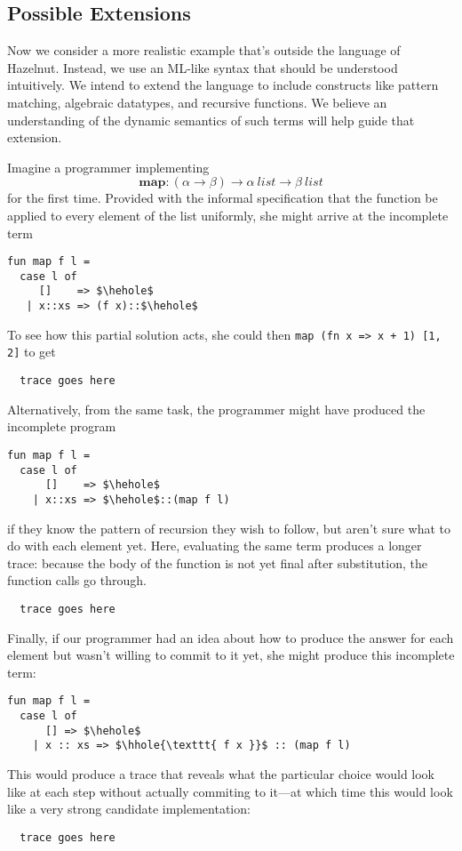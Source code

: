\subsection{Possible Extensions}
Now we consider a more realistic example that's outside the language of
Hazelnut. Instead, we use an ML-like syntax that should be understood
intuitively. We intend to extend the language to include constructs like
pattern matching, algebraic datatypes, and recursive functions. We believe
an understanding of the dynamic semantics of such terms will help guide
that extension.

Imagine a programmer implementing $$\mathbf{map} : (\alpha \to \beta) \to
\alpha ~\mathit{list} \to \beta ~\mathit{list}$$ for the first time.
Provided with the informal specification that the function be applied to
every element of the list uniformly, she might arrive at the incomplete term
\begin{lstlisting}
fun map f l = 
  case l of 
     []    => $\hehole$
   | x::xs => (f x)::$\hehole$
\end{lstlisting}
To see how this partial solution acts, she could then
\verb|map (fn x => x + 1) [1, 2]| to get
\begin{verbatim}
  trace goes here
\end{verbatim}
Alternatively, from the same task, the programmer might have produced the
incomplete program
\begin{lstlisting}
fun map f l =
  case l of 
      []    => $\hehole$
    | x::xs => $\hehole$::(map f l)
\end{lstlisting}
if they know the pattern of recursion they wish to follow, but aren't sure
what to do with each element yet. Here, evaluating the same term produces a
longer trace: because the body of the function is not yet final after
substitution, the function calls go through.

\begin{verbatim}
  trace goes here
\end{verbatim}

Finally, if our programmer had an idea about how to produce the answer for
each element but wasn't willing to commit to it yet, she might produce this
incomplete term:
\begin{lstlisting}
fun map f l =
  case l of
      [] => $\hehole$
    | x :: xs => $\hhole{\texttt{ f x }}$ :: (map f l)
\end{lstlisting}
This would produce a trace that reveals what the particular choice would
look like at each step without actually commiting to it---at which time
this would look like a very strong candidate implementation:
\begin{verbatim}
  trace goes here
\end{verbatim}
